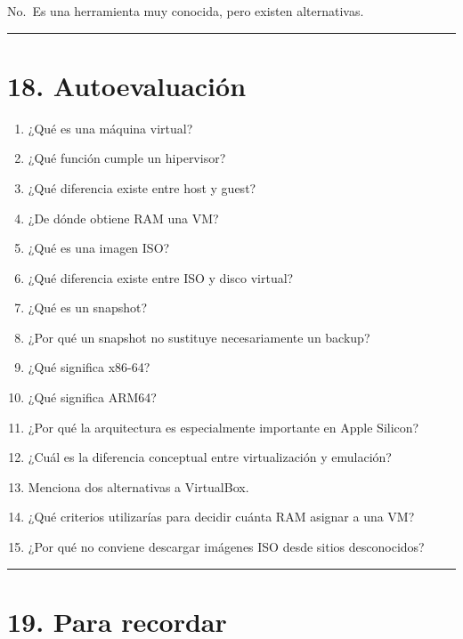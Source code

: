 \documentclass[
  spanish,
  letterpaper,
]{scrbook}
\providecommand{\tightlist}{%
  \setlength{\itemsep}{0pt}\setlength{\parskip}{0pt}}
\begin{document}
No.~Es una herramienta muy conocida, pero existen alternativas.

\begin{center}\rule{0.5\linewidth}{0.5pt}\end{center}


\chapter{18. Autoevaluación}\label{autoevaluaciuxf3n-7}

\begin{enumerate}
\def\labelenumi{\arabic{enumi}.}
\tightlist
\item
  ¿Qué es una máquina virtual?
\item
  ¿Qué función cumple un hipervisor?
\item
  ¿Qué diferencia existe entre host y guest?
\item
  ¿De dónde obtiene RAM una VM?
\item
  ¿Qué es una imagen ISO?
\item
  ¿Qué diferencia existe entre ISO y disco virtual?
\item
  ¿Qué es un snapshot?
\item
  ¿Por qué un snapshot no sustituye necesariamente un backup?
\item
  ¿Qué significa x86-64?
\item
  ¿Qué significa ARM64?
\item
  ¿Por qué la arquitectura es especialmente importante en Apple Silicon?
\item
  ¿Cuál es la diferencia conceptual entre virtualización y emulación?
\item
  Menciona dos alternativas a VirtualBox.
\item
  ¿Qué criterios utilizarías para decidir cuánta RAM asignar a una VM?
\item
  ¿Por qué no conviene descargar imágenes ISO desde sitios desconocidos?
\end{enumerate}

\begin{center}\rule{0.5\linewidth}{0.5pt}\end{center}


\chapter{19. Para recordar}\label{para-recordar-3}
\end{document}
